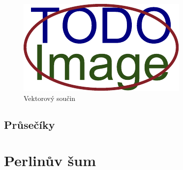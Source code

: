 \begin{figure}[H]
	\centering
	\includegraphics[width=.33\linewidth]{obrazky-figures/placeholder.pdf}
	\caption{Vektorový součin}
	\label{fig:lineární-algebra:cross}
\end{figure}

\subsection{Průsečíky}\label{ch:teorie:lineární-algebra:průsečíky}


\section{Perlinův šum}\label{ch:teorie:perlin}

